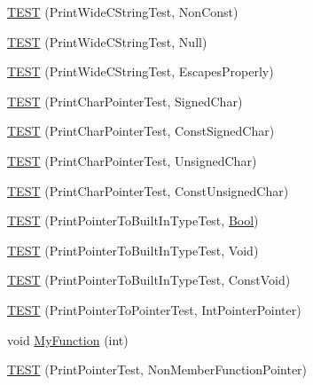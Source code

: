 \begin{DoxyCompactItemize}
\item 
\mbox{\hyperlink{namespacetesting_1_1gtest__printers__test_a8812b5f088e13083ebb8a7e35fbcdae7}{T\+E\+ST}} (Print\+Wide\+C\+String\+Test, Non\+Const)
\item 
\mbox{\hyperlink{namespacetesting_1_1gtest__printers__test_acd1267d49d61ad53b2b8a88f68fca3a7}{T\+E\+ST}} (Print\+Wide\+C\+String\+Test, Null)
\item 
\mbox{\hyperlink{namespacetesting_1_1gtest__printers__test_aa80d6bb47e6bf997dacf0c75322d12cf}{T\+E\+ST}} (Print\+Wide\+C\+String\+Test, Escapes\+Properly)
\item 
\mbox{\hyperlink{namespacetesting_1_1gtest__printers__test_acd7a56709621a91dca669023d192bdc7}{T\+E\+ST}} (Print\+Char\+Pointer\+Test, Signed\+Char)
\item 
\mbox{\hyperlink{namespacetesting_1_1gtest__printers__test_ae854b0ca4d06ffc273c391f262884681}{T\+E\+ST}} (Print\+Char\+Pointer\+Test, Const\+Signed\+Char)
\item 
\mbox{\hyperlink{namespacetesting_1_1gtest__printers__test_afb9a6a26323b287b7666b6adb5bdb149}{T\+E\+ST}} (Print\+Char\+Pointer\+Test, Unsigned\+Char)
\item 
\mbox{\hyperlink{namespacetesting_1_1gtest__printers__test_aa0487f8fd5052f7d6afe2b18ad7931f9}{T\+E\+ST}} (Print\+Char\+Pointer\+Test, Const\+Unsigned\+Char)
\item 
\mbox{\hyperlink{namespacetesting_1_1gtest__printers__test_ad08dcd672b1e66a802a564eb974c400a}{T\+E\+ST}} (Print\+Pointer\+To\+Built\+In\+Type\+Test, \mbox{\hyperlink{struct_bool}{Bool}})
\item 
\mbox{\hyperlink{namespacetesting_1_1gtest__printers__test_ac6d8b84db9386b399eb431b5b1668e87}{T\+E\+ST}} (Print\+Pointer\+To\+Built\+In\+Type\+Test, Void)
\item 
\mbox{\hyperlink{namespacetesting_1_1gtest__printers__test_a8819fb42392faae72e8bc594d498085d}{T\+E\+ST}} (Print\+Pointer\+To\+Built\+In\+Type\+Test, Const\+Void)
\item 
\mbox{\hyperlink{namespacetesting_1_1gtest__printers__test_afee54807b15b623718c62008bd743d4b}{T\+E\+ST}} (Print\+Pointer\+To\+Pointer\+Test, Int\+Pointer\+Pointer)
\item 
void \mbox{\hyperlink{namespacetesting_1_1gtest__printers__test_adf0e590d6776ecb7095a989ff2272d7b}{My\+Function}} (int)
\item 
\mbox{\hyperlink{namespacetesting_1_1gtest__printers__test_aa3cb60cf6f3a4a0cd7d9873cd597ffd8}{T\+E\+ST}} (Print\+Pointer\+Test, Non\+Member\+Function\+Pointer)

\end{DoxyCompactItemize}

